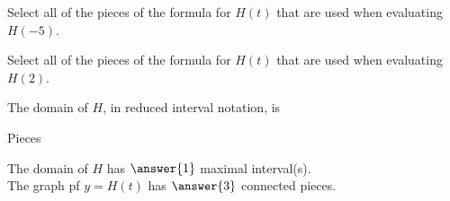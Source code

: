 \documentclass{ximera}
\begin{document}
\begin{exercise}

Select all of the pieces of the formula for $H(t)$ that are used when evaluating $H(-5)$.

\begin{selectAll}
\choice [correct]{$[-8, -3)$}
\choice {$(-3,6]$}
\end{selectAll} 
\end{exercise}




\begin{exercise}

Select all of the pieces of the formula for $H(t)$ that are used when evaluating $H(2)$.

\begin{selectAll}
\choice {$[-8, -3)$}
\choice [correct]{$(-3,6]$}
\end{selectAll} 
\end{exercise}






\begin{exercise}

The domain of $H$, in reduced interval notation, is

\begin{multipleChoice}
\choice {$[-8, -3) \cup {-3} \cup (-3, 6)$}
\choice {$[-8, -3) \cup (-3, 6)$}
\choice [correct]{$[-8, 6]$}
\end{multipleChoice}


\end{exercise}



\begin{exercise}  Pieces 


The domain of $H$ has $\answer{1}$ maximal interval(s). \\


The graph pf $y = H(t)$ has $\answer{3}$ connected pieces.

\end{exercise}
\end{document}
